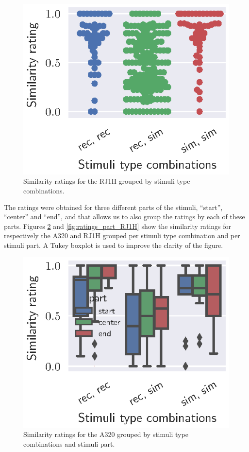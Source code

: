 \begin{figure}[H]
  \centering
  \includegraphics[]{../figures/manual/auralisation-paper/figure4_ratings_RJ1H}
  \caption{Similarity ratings for the RJ1H grouped by stimuli type combinations.}
  \label{fig:ratings_RJ1H}
\end{figure}

The ratings were obtained for three different parts of the stimuli, ``start'',
``center'' and ``end'', and that allows us to also group the ratings by each of
these parts. Figures \ref{fig:ratings_part_A320} and \ref{fig:ratings_part_RJ1H}
show the similarity ratings for respectively the A320 and RJ1H grouped per
stimuli type combination and per stimuli part. A Tukey boxplot is used to
improve the clarity of the figure.

\begin{figure}[H]
  \centering
  \includegraphics[]{../figures/manual/auralisation-paper/figure5_ratings_part_A320}
  \caption{Similarity ratings for the A320 grouped by stimuli type combinations and stimuli part.}
  \label{fig:ratings_part_A320}
\end{figure}

